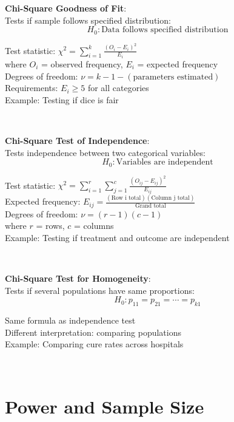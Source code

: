 \documentclass{article}
\newenvironment{cheatformula}[1][Title]{
    \begin{minipage}{\linewidth}
    \textbf{#1}:\\
}{
    \end{minipage}\\[2ex]
}
\begin{document}
\begin{multicols*}{2}
\begin{cheatformula}[Chi-Square Goodness of Fit]
    Tests if sample follows specified distribution:
    $$H_0: \text{Data follows specified distribution}$$
    
    Test statistic: $\chi^2 = \sum_{i=1}^k \frac{(O_i - E_i)^2}{E_i}$\\
    where $O_i$ = observed frequency, $E_i$ = expected frequency\\
    
    Degrees of freedom: $\nu = k - 1 - (\text{parameters estimated})$\\
    
    Requirements: $E_i \geq 5$ for all categories\\
    
    Example: Testing if dice is fair
\end{cheatformula}

\begin{cheatformula}[Chi-Square Test of Independence]
    Tests independence between two categorical variables:
    $$H_0: \text{Variables are independent}$$
    
    Test statistic: $\chi^2 = \sum_{i=1}^r \sum_{j=1}^c \frac{(O_{ij} - E_{ij})^2}{E_{ij}}$\\
    
    Expected frequency: $E_{ij} = \frac{(\text{Row i total})(\text{Column j total})}{\text{Grand total}}$\\
    
    Degrees of freedom: $\nu = (r-1)(c-1)$\\
    where $r$ = rows, $c$ = columns\\
    
    Example: Testing if treatment and outcome are independent
\end{cheatformula}

\begin{cheatformula}[Chi-Square Test for Homogeneity]
    Tests if several populations have same proportions:
    $$H_0: p_{11} = p_{21} = \cdots = p_{k1}$$
    
    Same formula as independence test\\
    Different interpretation: comparing populations\\
    
    Example: Comparing cure rates across hospitals
\end{cheatformula}

\section{Power and Sample Size}


\end{multicols*}
\end{document}
